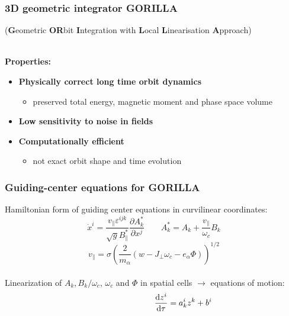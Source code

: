 \documentclass{beamer}
\newcommand{\be}[1]{\begin{equation} \label{#1}}
\newcommand{\ee}{\end{equation}}
\newcommand{\difp}[2]{\frac{\partial #1}{\partial #2}}
\newcommand{\rd}{{\rm d}}
\begin{document}
\begin{frame}
\frametitle{3D geometric integrator \textbf{GORILLA}}
\vspace{-0.8cm}
\begin{scriptsize}
	  (\textbf{G}eometric \textbf{OR}bit \textbf{I}ntegration with \textbf{L}ocal \textbf{L}inearisation \textbf{A}pproach)
\end{scriptsize}
\vspace{0.5cm}\\
\textbf{Properties:}
\vspace{-0.0cm}
\begin{itemize}
	\item \textbf{Physically correct long time orbit dynamics}
	\begin{itemize}
		\item preserved total energy, magnetic moment and phase space volume
	\end{itemize}
	\item \textbf{Low sensitivity to noise in fields}
	\item \textbf{Computationally efficient}
		\begin{itemize}
			\item not exact orbit shape and time evolution
		\end{itemize}
\end{itemize}
\end{frame}

\begin{frame}
\frametitle{Guiding-center equations for \textbf{GORILLA}}
\vspace{-0.5cm}
Hamiltonian form of guiding center equations in curvilinear coordinates:
\vspace{-0.05cm}\\
\be{eqm_curv}
\dot x^i = \frac{v_\parallel \varepsilon^{ijk}}{\sqrt{g} B_\parallel^\ast}\difp{A^\ast_k}{x^j} \qquad A^\ast_k = A_k + \frac{v_\parallel}{\omega_c}B_k
\ee
\be{}
v_\parallel=\sigma \left(\frac{2}{m_\alpha}\left(w-J_\perp\omega_c-e_\alpha\Phi\right)\right)^{1/2}
\ee
\vspace{0.075cm}\\
Linearization of $A_k, B_k/ \omega_c$, $\omega_c$ and $\Phi$ in spatial cells \newline$\rightarrow$ equations of motion:
\vspace{-0.5cm}
\be{standeqset}
\hspace{2.5cm}\frac{\rd z^i}{\rd \tau} = a^i_k z^k + b^i
\ee
\end{frame}
\end{document}
